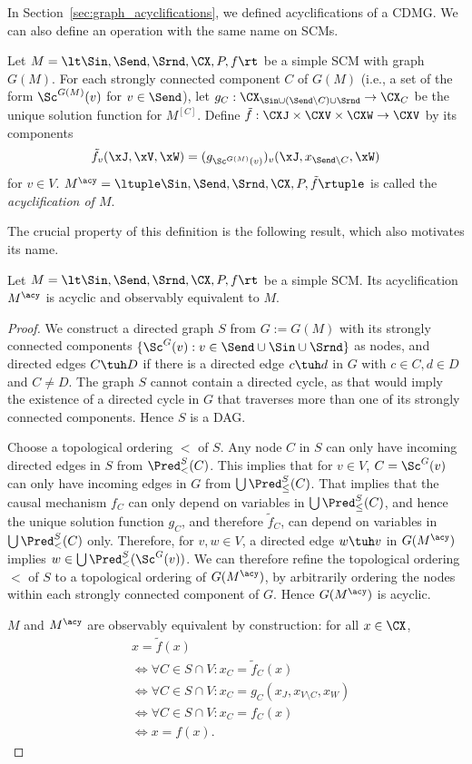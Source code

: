 In Section~\ref{sec:graph_acyclifications}, we defined acyclifications of a CDMG.
We can also define an operation with the same name on SCMs.
\begin{Def}\label{def:scm_acyclification}
  Let $M = \lt \Sin, \Send, \Srnd, \CX, P, f \rt$ be a simple SCM with graph $G(M)$.
  For each strongly connected component $C$ of $G(M)$ (i.e., a set of the form
  $\Sc^{G(M)}(v)$ for $v \in \Send$), let 
  $g_C : \CX_{\Sin \cup (\Send \setminus C) \cup \Srnd} \to \CX_C$
  be the unique solution function for $M^{[C]}$.
  Define $\tilde{f} : \CXJ \times \CXV \times \CXW \to \CXV$ by its components
  $$\tilde{f}_v(\xJ,\xV,\xW) = (g_{\Sc^{G(M)}(v)})_v(\xJ,x_{\Send\setminus C},\xW)$$
  for $v \in V$.
  $M^\acy = \ltuple \Sin, \Send, \Srnd, \CX, P, \tilde{f} \rtuple$ is called the
  \emph{acyclification of $M$}.
\end{Def}
The crucial property of this definition is the following result, which also motivates its name.
\begin{Prp}\label{prp:scm_acyclification_properties}
  Let $M = \lt \Sin, \Send, \Srnd, \CX, P, f \rt$ be a simple SCM. Its acyclification $M^\acy$ is
  acyclic and observably equivalent to $M$.
\end{Prp}
\begin{proof}
  We construct a directed graph $S$ from $G := G(M)$ with its strongly connected components $\{\Sc^G(v) : v \in \Send \cup \Sin \cup \Srnd\}$
  as nodes, and directed edges
  $C \tuh D$ if there is a directed edge $c \tuh d$ in $G$ with $c \in C, d \in D$ and $C \ne D$.
  The graph $S$ cannot contain a directed cycle, as that would imply the existence of a directed
  cycle in $G$ that traverses more than one of its strongly connected components. Hence $S$ is a DAG.
  
  Choose a topological ordering $<$ of $S$.
  Any node $C$ in $S$ can only have incoming directed edges
  in $S$ from $\Pred^S_<(C)$. This implies that for $v \in V$, $C = \Sc^G(v)$ can only have incoming
  edges in $G$ from $\bigcup \Pred^S_\le(C)$. That implies that the causal mechanism $f_C$
  can only depend on variables in $\bigcup \Pred^S_\le(C)$, and hence
  the unique solution function $g_C$, and therefore $\tilde{f}_C$, can depend on variables in $\bigcup \Pred^S_<(C)$ only.
  Therefore, for $v,w \in V$, a directed edge $w \tuh v$ in $G(M^\acy)$ implies 
  $w \in \bigcup \Pred^S_<(\Sc^G(v))$. We can therefore refine the topological ordering $<$ of $S$ 
  to a topological ordering of $G(M^\acy)$, by arbitrarily ordering the nodes within each strongly connected component
  of $G$. Hence $G(M^\acy)$ is acyclic.

  $M$ and $M^\acy$ are observably equivalent by construction: for all $x \in \CX$,
  \begin{align*}
  & x = \tilde{f}(x) \\
  & \iff \forall C \in S \cap V: x_C = \tilde{f}_C(x) \\
  & \iff \forall C \in S \cap V: x_C = g_C(x_J,x_{V\setminus C},x_W) \\
  & \iff \forall C \in S \cap V: x_C = f_C(x) \\
  & \iff x = f(x).
  \end{align*}
\end{proof}
